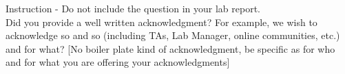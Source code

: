 \documentclass[main.tex]{subfiles}
\begin{document}
Instruction - Do not include the question in your lab report.\\
Did you provide a well written acknowledgment? For example, we wish to acknowledge so and so (including TAs, Lab Manager, online communities, etc.) and for what? [No boiler plate kind of acknowledgment, be specific as for who and for what you are offering your acknowledgments]
\end{document}
